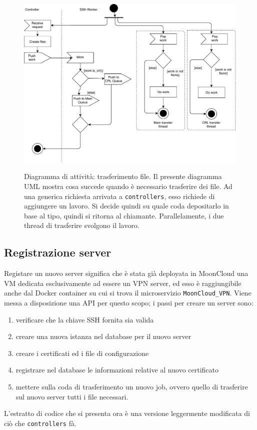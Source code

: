 \inputminted[tabsize=4, breaklines]{lua}{code_samples/works.lua}

\begin{figure}
	\includegraphics[scale=0.5]{img/activity_generic_file_transfer}
	\label{fig:activity-generic-file-transfer}
	\caption[Diagramma di attività: trasferimento file]{Diagramma di attività:
	trasferimento file. Il presente diagramma UML mostra cosa succede quando è necessario
	trasferire dei file. Ad una generica richiesta arrivata a \texttt{controllers},
	esso richiede di aggiungere un lavoro. Si decide quindi su quale coda
	depositarlo in base al tipo, quindi si ritorna al chiamante.
	Parallelamente, i due thread di trasferire svolgono il lavoro.}
\end{figure}


\subsection{Registrazione server}
Registare un nuovo server significa che è stata già deployata in MoonCloud una VM dedicata
esclusivamente ad essere un VPN server, ed esso è raggiungibile anche dal Docker container su
cui si trova il microservizio \texttt{MoonCloud\_VPN}.
Viene messa a disposizione una API per questo scopo; i passi per creare un server sono:
\begin{enumerate}
    \item verificare che la chiave SSH fornita sia valida
    \item creare una nuova istanza nel database per il nuovo server
    \item creare i certificati ed i file di configurazione
    \item registrare nel database le informazioni relative al nuovo certificato
    \item mettere sulla coda di trasferimento un nuovo job, ovvero quello di
    trasferire sul nuovo server tutti i file necessari.
\end{enumerate}
L'estratto di codice che si presenta ora è una versione leggermente modificata di ciò che
\texttt{controllers} fà.
\inputminted[tabsize=4, breaklines]{python}{code_samples/controllers_create_server.py}

